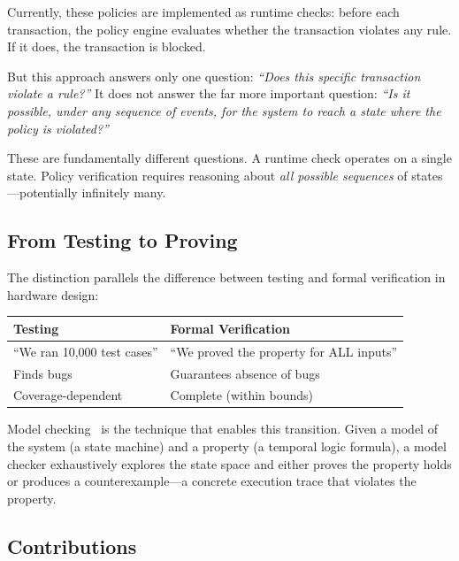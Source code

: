 \documentclass{llncs}
\begin{document}
Currently, these policies are implemented as runtime checks: before each transaction, the policy engine evaluates whether the transaction violates any rule. If it does, the transaction is blocked.

But this approach answers only one question: \textit{``Does this specific transaction violate a rule?''} It does not answer the far more important question: \textit{``Is it possible, under any sequence of events, for the system to reach a state where the policy is violated?''}

These are fundamentally different questions. A runtime check operates on a single state. Policy verification requires reasoning about \textit{all possible sequences} of states---potentially infinitely many.

\subsection{From Testing to Proving}

The distinction parallels the difference between testing and formal verification in hardware design:

\begin{center}
\begin{tabular}{ll}
\toprule
\textbf{Testing} & \textbf{Formal Verification} \\
\midrule
``We ran 10,000 test cases'' & ``We proved the property for ALL inputs'' \\
Finds bugs & Guarantees absence of bugs \\
Coverage-dependent & Complete (within bounds) \\
\bottomrule
\end{tabular}
\end{center}

Model checking~\cite{clarke1999, baier2008} is the technique that enables this transition. Given a model of the system (a state machine) and a property (a temporal logic formula), a model checker exhaustively explores the state space and either proves the property holds or produces a counterexample---a concrete execution trace that violates the property.

\subsection{Contributions}
\end{document}
